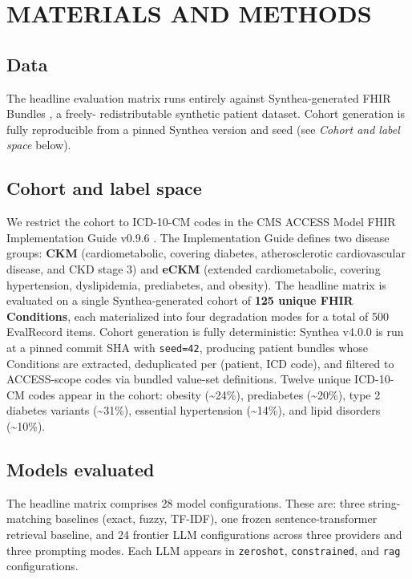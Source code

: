 \section{MATERIALS AND METHODS}\label{materials-and-methods}

\subsection{Data}\label{data}

The headline evaluation matrix runs entirely against
Synthea-generated FHIR Bundles \autocite{Walonoski2018}, a freely-
redistributable synthetic patient dataset. Cohort generation is
fully reproducible from a pinned Synthea version and seed (see
\emph{Cohort and label space} below).

\subsection{Cohort and label space}\label{cohort-and-label-space}

We restrict the cohort to ICD-10-CM codes in the CMS ACCESS Model
FHIR Implementation Guide v0.9.6 \autocite{CMS2026}. The Implementation
Guide defines two disease groups: \textbf{CKM} (cardiometabolic, covering
diabetes, atherosclerotic cardiovascular disease, and CKD stage 3)
and \textbf{eCKM} (extended cardiometabolic, covering hypertension,
dyslipidemia, prediabetes, and obesity). The headline matrix is
evaluated on a single Synthea-generated cohort of \textbf{125 unique FHIR
Conditions}, each materialized into four degradation modes for a
total of 500 EvalRecord items. Cohort generation is fully
deterministic: Synthea v4.0.0 \autocite{Walonoski2018} is run at a pinned
commit SHA with \texttt{seed=42}, producing patient bundles whose
Conditions are extracted, deduplicated per (patient, ICD code), and
filtered to ACCESS-scope codes via bundled value-set definitions.
Twelve unique ICD-10-CM codes appear in the cohort: obesity (\textasciitilde24\%),
prediabetes (\textasciitilde20\%), type 2 diabetes variants (\textasciitilde31\%), essential
hypertension (\textasciitilde14\%), and lipid disorders (\textasciitilde10\%).

\subsection{Models evaluated}\label{models-evaluated}

The headline matrix comprises 28 model configurations. These are:
three string-matching baselines (exact, fuzzy, TF-IDF), one frozen
sentence-transformer retrieval baseline, and 24 frontier LLM
configurations across three providers and three prompting modes.
Each LLM appears in \texttt{zeroshot}, \texttt{constrained}, and \texttt{rag}
configurations.


